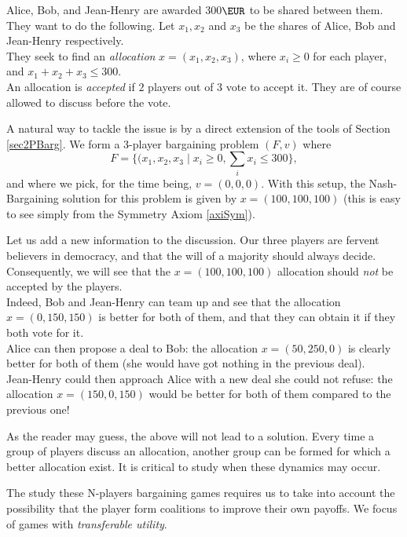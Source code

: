 \begin{example}
\label{exCoal1}
Alice, Bob, and Jean-Henry are awarded 300$\EUR$ to be shared between them.
They want to do the following. Let $x_1, x_2$ and $x_3$ be the shares of Alice, Bob and Jean-Henry respectively.\\
They seek to find an \emph{allocation} $x = (x_1, x_2, x_3)$, where $x_i \geq 0$ for each player, and $x_1 + x_2 +x_3  \leq 300$.\\
An allocation is \emph{accepted} if $2$ players out of $3$ vote to accept it. They are of course allowed to discuss before the vote.

A natural way to tackle the issue is by a direct extension of the tools of Section \ref{sec2PBarg}. We form a 3-player bargaining problem $(F,v)$ where
$$ F = \{(x_1, x_2, x_3 \mid x_i \geq 0, \sum_i x_i \leq 300\},$$
and where we pick, for the time being, $v = (0,0,0)$. With this setup, the Nash-Bargaining solution for this problem is given by $x = (100,100,100)$ (this is easy to see simply from the Symmetry Axiom \ref{axiSym}).

Let us add a new information to the discussion. Our three players are fervent believers in democracy, and that the will of a majority should always decide. Consequently, we will see that the $x = (100,100,100)$ allocation should \emph{not} be accepted by the players.\\
Indeed, Bob and Jean-Henry can team up and see that the allocation $x = (0,150,150)$ is better for both of them, and that they can obtain it if they both vote for it. \\
Alice can then propose a deal to Bob: the allocation $x = (50, 250, 0)$ is clearly better for both of them (she would have got nothing in the previous deal).\\
Jean-Henry could then approach Alice with a new deal she could not refuse: the allocation $x = (150,0,150)$ would be better for both of them compared to the previous one!

As the reader may guess, the above will not lead to a solution. Every time a group of players  discuss an allocation, another group can be formed for which a better allocation exist. It is critical to study when these dynamics may occur.
\end{example}




The study these N-players bargaining games requires us to take into account the possibility that the player form  coalitions to improve their own payoffs.
We focus of games with \emph{transferable utility}.

